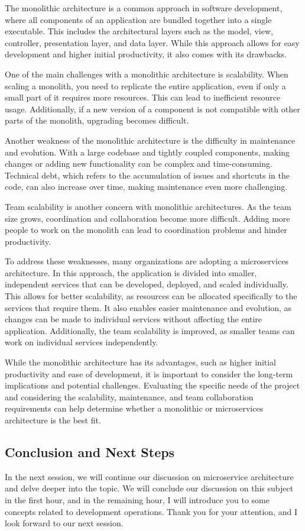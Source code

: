 The monolithic architecture is a common approach in software
development, where all components of an application are bundled together
into a single executable. This includes the architectural layers such as
the model, view, controller, presentation layer, and data layer. While
this approach allows for easy development and higher initial
productivity, it also comes with its drawbacks.

One of the main challenges with a monolithic architecture is
scalability. When scaling a monolith, you need to replicate the entire
application, even if only a small part of it requires more resources.
This can lead to inefficient resource usage. Additionally, if a new
version of a component is not compatible with other parts of the
monolith, upgrading becomes difficult.

Another weakness of the monolithic architecture is the difficulty in
maintenance and evolution. With a large codebase and tightly coupled
components, making changes or adding new functionality can be complex
and time-consuming. Technical debt, which refers to the accumulation of
issues and shortcuts in the code, can also increase over time, making
maintenance even more challenging.

Team scalability is another concern with monolithic architectures. As
the team size grows, coordination and collaboration become more
difficult. Adding more people to work on the monolith can lead to
coordination problems and hinder productivity.

To address these weaknesses, many organizations are adopting a
microservices architecture. In this approach, the application is divided
into smaller, independent services that can be developed, deployed, and
scaled individually. This allows for better scalability, as resources
can be allocated specifically to the services that require them. It also
enables easier maintenance and evolution, as changes can be made to
individual services without affecting the entire application.
Additionally, the team scalability is improved, as smaller teams can
work on individual services independently.

While the monolithic architecture has its advantages, such as higher
initial productivity and ease of development, it is important to
consider the long-term implications and potential challenges. Evaluating
the specific needs of the project and considering the scalability,
maintenance, and team collaboration requirements can help determine
whether a monolithic or microservices architecture is the best fit.

\subsection{Conclusion and Next Steps}

In the next session, we will continue our discussion on microservice
architecture and delve deeper into the topic. We will conclude our
discussion on this subject in the first hour, and in the remaining hour,
I will introduce you to some concepts related to development operations.
Thank you for your attention, and I look forward to our next session.
